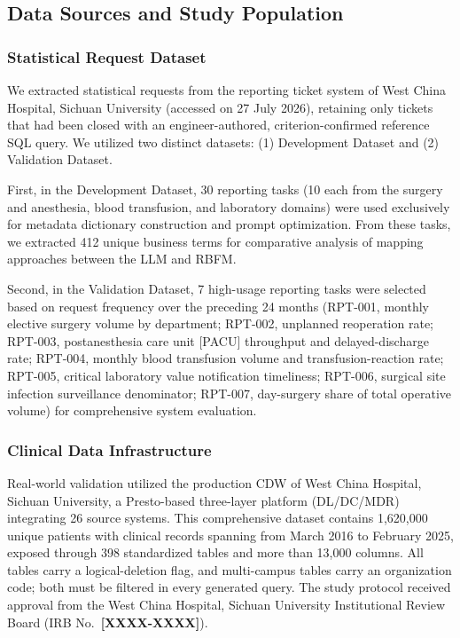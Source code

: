 \documentclass[applsci,article,submit,pdftex,oneauthor]{Definitions/mdpi}
\newcommand{\PH}[1]{{\color{red}\textbf{[#1]}}}
\begin{document}
\subsection{Data Sources and Study Population}

\subsubsection{Statistical Request Dataset}
We extracted statistical requests from the reporting ticket system of
West China Hospital, Sichuan University (accessed on 27 July 2026), retaining only tickets that had been
closed with an engineer-authored, criterion-confirmed reference SQL query. We
utilized two distinct datasets: (1) Development Dataset and (2) Validation
Dataset.

First, in the Development Dataset, 30 reporting tasks (10 each from the surgery
and anesthesia, blood transfusion, and laboratory domains) were used exclusively
for metadata dictionary construction and prompt optimization. From these tasks,
we extracted 412 unique business terms for comparative analysis of mapping
approaches between the LLM and RBFM.

Second, in the Validation Dataset, 7 high-usage reporting tasks were selected
based on request frequency over the preceding 24 months (RPT-001, monthly
elective surgery volume by department; RPT-002, unplanned reoperation rate;
RPT-003, postanesthesia care unit [PACU] throughput and delayed-discharge rate;
RPT-004, monthly blood transfusion volume and transfusion-reaction rate;
RPT-005, critical laboratory value notification timeliness; RPT-006, surgical
site infection surveillance denominator; RPT-007, day-surgery share of total
operative volume) for comprehensive system evaluation.

\subsubsection{Clinical Data Infrastructure}
Real-world validation utilized the production CDW of West China Hospital, Sichuan University, a
Presto-based three-layer platform (DL/DC/MDR) integrating 26 source
systems. This comprehensive dataset contains 1,620,000 unique patients with
clinical records spanning from March 2016 to February 2025, exposed
through 398 standardized tables and more than 13,000 columns. All tables
carry a logical-deletion flag, and multi-campus tables carry an organization
code; both must be filtered in every generated query. The study protocol
received approval from the West China Hospital, Sichuan University Institutional Review Board (IRB
No.\ \PH{XXXX-XXXX}).
\end{document}

